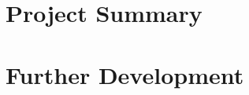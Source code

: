 \section{Project Summary}
\label{project_summary}


\section{Further Development}
\label{further_development}

